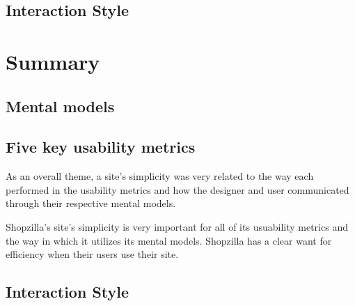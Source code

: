 \documentclass[11pt, oneside]{article}
\begin{document}
\subsection{Interaction Style}

\pagebreak

\section{Summary}

\subsection{Mental models}

\subsection{Five key usability metrics}

As an overall theme, a site's simplicity was very related to the way each performed in the usability metrics and how the designer and user communicated through their respective mental models.

Shopzilla's site's simplicity is very important for all of its usuability metrics and the way in which it utilizes its mental models. Shopzilla has a clear want for efficiency when their users use their site.

\subsection{Interaction Style}
\end{document}
